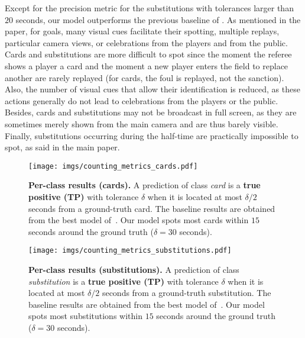 \documentclass[10pt,twocolumn,letterpaper]{article}
\begin{document}
Except for the precision metric for the substitutions with tolerances larger than $20$ seconds, our model outperforms the previous baseline of \SoccerNet. As mentioned in the paper, for goals, many visual cues facilitate their spotting, \eg multiple replays, particular camera views, or celebrations from the players and from the public. Cards and substitutions are more difficult to spot since the moment the referee shows a player a card and the moment a new player enters the field to replace another are rarely replayed (\eg for cards, the foul is replayed, not the sanction). Also, the number of visual cues that allow their identification is reduced, as these actions generally do not lead to celebrations from the players or the public. Besides, cards and substitutions may not be broadcast in full screen, as they are sometimes merely shown from the main camera and are thus barely visible. Finally, substitutions occurring during the half-time are practically impossible to spot, as said in the main paper.

\begin{figure}
    \centering
    \texttt{[image: imgs/counting\_metrics\_cards.pdf]}\\
    \caption{\textbf{Per-class results (cards).} A prediction of class \emph{card} is a {\color{anthoblue}\textbf{true positive (TP)}} with tolerance $\delta$ when it is located at most $\delta/2$ seconds from a ground-truth card. The baseline results are obtained from the best model of~\cite{Giancola_2018_CVPR_Workshops}. Our model spots most cards within $15$ seconds around the ground truth ($\delta=30$ seconds). 
    }
    \label{fig:cardmetrics}
\end{figure}
\begin{figure}
    \centering
    \texttt{[image: imgs/counting\_metrics\_substitutions.pdf]}\\
    \caption{\textbf{Per-class results (substitutions).} A prediction of class \emph{substitution} is a {\color{anthoblue}\textbf{true positive (TP)}} with tolerance $\delta$ when it is located at most $\delta/2$ seconds from a ground-truth substitution. The baseline results are obtained from the best model of~\cite{Giancola_2018_CVPR_Workshops}. Our model spots most substitutions within $15$ seconds around the ground truth ($\delta=30$ seconds). 
    }
    \label{fig:substitutionmetrics}
\end{figure}
\end{document}
